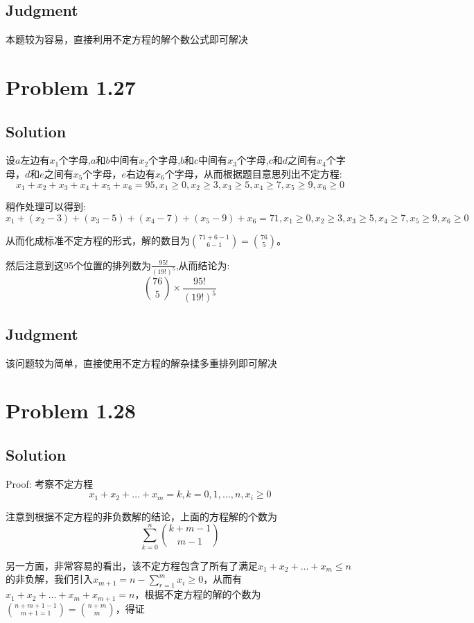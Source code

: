 \documentclass[a4paper]{ctexart}
\begin{document}
\subsection{Judgment}
本题较为容易，直接利用不定方程的解个数公式即可解决

\section{Problem 1.27}
\subsection{Solution}
设$a$左边有$x_1$个字母,$a$和$b$中间有$x_2$个字母,$b$和$c$中间有$x_3$个字母,$c$和$d$之间有$x_4$个字母，$d$和$e$之间有$x_5$个字母，$e$右边有$x_6$个字母，从而根据题目意思列出不定方程:
\begin{equation}
    x_1+x_2+x_3+x_4+x_5+x_6=95, x_1 \geq 0, x_2\geq 3,x_3\geq 5, x_4\geq 7,x_5\geq 9, x_6\geq 0
\end{equation}
\par
稍作处理可以得到:
\begin{equation}
    x_1+(x_2-3)+(x_3-5)+(x_4-7)+(x_5-9)+x_6=71, x_1 \geq 0, x_2\geq 3,x_3\geq 5, x_4\geq 7,x_5\geq 9, x_6\geq 0
\end{equation}
\par
从而化成标准不定方程的形式，解的数目为$\binom{71+6-1}{6-1}=\binom{76}{5}$。
\par
然后注意到这95个位置的排列数为$\frac{95!}{(19!)^5}$,从而结论为:
\begin{equation}
    \binom{76}{5}\times\frac{95!}{(19!)^5}
\end{equation}
\subsection{Judgment}
该问题较为简单，直接使用不定方程的解杂揉多重排列即可解决
\section{Problem 1.28}
\subsection{Solution}
Proof: 考察不定方程
\begin{equation}
    x_1 + x_2 + \dots + x_m = k, k = 0,1,\dots, n, x_i\geq 0
\end{equation}
\par
注意到根据不定方程的非负数解的结论，上面的方程解的个数为
\begin{equation}
    \sum_{k=0}^{n}\binom{k+m-1}{m-1}
\end{equation}
\par
另一方面，非常容易的看出，该不定方程包含了所有了满足$x_1+x_2+\dots+x_m\leq n$的非负解，我们引入$x_{m+1}=n-\sum_{r=1}^{m}x_i\geq 0$，从而有$x_1+x_2+\dots+x_m+x_{m+1}=n$，根据不定方程的解的个数为$\binom{n+m+1-1}{m+1=1}=\binom{n+m}{m}$，得证
\end{document}
